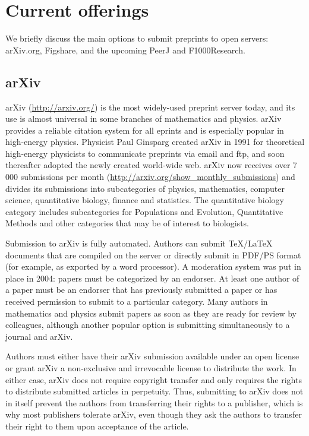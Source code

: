\documentclass[letterpaper,twocolumn,superscriptaddress,showkeys,longbibliography]{revtex4-1}
\begin{document}
\section{Current offerings}

We briefly discuss the main options to submit preprints to open servers:
arXiv.org, Figshare, and the upcoming PeerJ and F1000Research.

\subsection{arXiv}

arXiv (\url{http://arxiv.org/}) is the most widely-used preprint server today,
and its use is almost universal in some branches of mathematics and physics.
arXiv provides a reliable citation system for all eprints and is especially
popular in high-energy physics. Physicist Paul Ginsparg created arXiv in 1991
for theoretical high-energy physicists to communicate preprints via email and
ftp, and soon thereafter adopted the newly created world-wide
web\cite{jackson2002preprints}.  arXiv now receives over 7 000 submissions per
month (\url{http://arxiv.org/show_monthly_submissions}) and divides its
submissions into subcategories of physics, mathematics, computer science,
quantitative biology, finance and statistics.  The quantitative biology category
includes subcategories for Populations and Evolution, Quantitative Methods and
other categories that may be of interest to biologists.

Submission to arXiv is fully automated.  Authors can submit \TeX{}/\LaTeX{}
documents that are compiled on the server or directly submit in PDF/PS format
(for example, as exported by a word processor).  A moderation system was put in
place in 2004: papers must be categorized by an endorser. At least one author of
a paper must be an endorser that has previously submitted a paper or has
received permission to submit to a particular category.  Many authors in
mathematics and physics submit papers as soon as they are ready for review by
colleagues, although another popular option is submitting simultaneously to a
journal and arXiv.

Authors must either have their arXiv submission available under an open license
or grant arXiv a non-exclusive and irrevocable license to distribute the work.
In either case, arXiv does not require copyright transfer and only requires the
rights to distribute submitted articles in perpetuity. Thus, submitting to arXiv
does not in itself prevent the authors from transferring their rights to a
publisher, which is why most publishers tolerate arXiv, even though they ask the
authors to transfer their right to them upon acceptance of the article.
\end{document}
